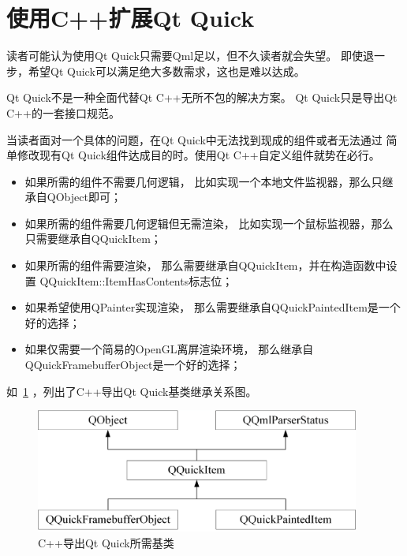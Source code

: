 ﻿




\FloatBarrier
\section{
使用C{\sourcefonttwo{}+}{\sourcefonttwo{}+}扩展Qt Quick
}\label{s100710}


读者可能认为使用Qt Quick只需要Qml足以，但不久读者就会失望。
即使退一步，希望Qt Quick可以满足绝大多数需求，这也是难以达成。

Qt Quick不是一种全面代替Qt C{\sourcefonttwo{}+}{\sourcefonttwo{}+}无所不包的解决方案。
Qt Quick只是导出Qt C{\sourcefonttwo{}+}{\sourcefonttwo{}+}的一套接口规范。

当读者面对一个具体的问题，在Qt Quick中无法找到现成的组件或者无法通过
简单修改现有Qt Quick组件达成目的时。使用Qt C{\sourcefonttwo{}+}{\sourcefonttwo{}+}自定义组件就势在必行。

\begin{itemize}

\item 如果所需的组件不需要几何逻辑，
比如实现一个本地文件监视器，那么只继承自QObject即可；

\item 如果所需的组件需要几何逻辑但无需渲染，
比如实现一个鼠标监视器，那么只需要继承自QQuickItem；

\item 如果所需的组件需要渲染，
那么需要继承自QQuickItem，并在构造函数中设置
QQuickItem::ItemHasContents标志位；

\item 如果希望使用QPainter实现渲染，
那么需要继承自QQuickPaintedItem是一个好的选择；

\item 如果仅需要一个简易的OpenGL离屏渲染环境，
那么继承自QQuickFramebufferObject是一个好的选择；

\end{itemize}

如\figurename\ \ref{p000010}
，列出了C{\sourcefonttwo{}+}{\sourcefonttwo{}+}导出Qt Quick基类继承关系图。

\begin{figure}[htb] %
\marginnote{\setlength\fboxsep{2pt}\fbox{\footnotesize{\kaishu\figurename\,}\footnotesize{\ref{p000010}}}}\centering %
\includegraphics[width=0.95\textwidth]{the_book_image/p000010.eps} %
\caption{C{\sourcefonttwo{}+}{\sourcefonttwo{}+}导出Qt Quick所需基类} %
\label{p000010} %
\end{figure}


